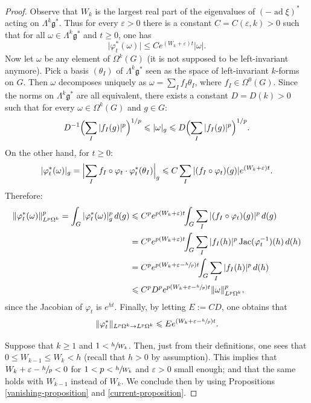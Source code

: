 \documentclass[JEP,XML,SOM,Unicode,published]{cedram}
\newcommand{\NoChangel}[1]{%
\expandafter\let\csname old\string#1\endcsname=#1
\let#1=\relax
\newcommand{#1}{\mathcode`l="716C\csname old\string#1\endcsname\mathcode`l="7160 }%
}
\theoremstyle{plain}
\theoremstyle{remark}
\theoremstyle{definition}
\DeclareMathOperator{\ad}{ad}
\DeclareMathOperator{\Jac}{Jac}
\DeclareMathOperator{\vol}{vol}\NoChangel{\vol}
\begin{document}
\begin{proof}
Observe that $W_k$ is the largest real part
of the eigenvalues of $(-\ad \xi)^*$ acting on $\Lambda^k \mathfrak g^*$.
Thus for every $\varepsilon >0$ there is a constant $C = C(\varepsilon, k) >0$ such that
for all $\omega \in \Lambda^k \mathfrak g^*$ and $t\ge0$, one has
\[\vert \varphi_t^* (\omega) \vert \leqslant C e^{(W_k + \varepsilon)t} \vert \omega \vert.\]
Now let $\omega$ be any element of $\Omega^k(G)$ (it is not supposed to be left-invariant anymore).
Pick a basis $(\theta_I)$ of $\Lambda^k \mathfrak g^*$ seen as the space of left-invariant $k$-forms on $G$.
Then $\omega$ decomposes uniquely as $\omega = \sum_I f_I \theta_I$, where $f_I \in \Omega^0(G)$.
Since the norms on $\Lambda^k \mathfrak g^*$ are all equivalent, there exists a constant $D = D(k)>0$ such that for every
$\omega \in \Omega^k(G)$ and $g \in G$:
\[D^{-1} \Bigl(\sum_I \vert f_I(g) \vert^p \Bigr)^{1/p}
\leqslant \vert \omega \vert_g \leqslant
D \Bigl(\sum_I \vert f_I(g) \vert^p \Bigr)^{1/p}.\]
On the other hand, for $t \geqslant 0$:
\[\vert \varphi_t^* (\omega) \vert_g = \Bigl\vert \sum_I f_I \circ \varphi_t\cdot \varphi_t^* (\theta_I) \Bigr\vert_g
\leqslant C \sum_I \vert (f_I \circ \varphi_t)(g) \vert e^{(W_k + \varepsilon)t}.\]
Therefore:\vspace*{-3pt}\enlargethispage{.5\baselineskip}
\begin{align*}
\Vert \varphi_t^* (\omega) \Vert_{L^p \Omega^k}^p = \int_G \vert \varphi_t^* (\omega) \vert_g^p \,d\vol(g)&\leqslant C^p e^{p(W_k + \varepsilon)t}\!\! \int_G \sum_I \vert (f_I \circ \varphi_t)(g) \vert^p \,d \vol(g)\\
&= C^p e^{p(W_k + \varepsilon)t}\!\! \int_G \sum_I \vert f_I (h) \vert^p \Jac(\varphi_t^{-1}) (h) \,d \vol (h)\\
&= C^p e^{p(W_k + \varepsilon - \sfrac{h}{p})t}\!\! \int_G \sum_I \vert f_I (h) \vert^p \,d \vol (h)\\
&\leqslant C^p D^p e^{p(W_k + \varepsilon - \sfrac{h}{p})t} \Vert \omega \Vert_{L^p \Omega^k}^p,
\end{align*}
since the Jacobian of $\varphi_t$ is $e^{ht}$.
Finally, by letting $E:= CD$, one obtains that
\[\Vert \varphi_t^*\Vert_{L^p \Omega^k \to L^p \Omega^k} \leqslant E e^{(W_k + \varepsilon - \sfrac{h}{p})t}.\]

Suppose that $k \geqslant 1$ and $1<\sfrac{h}{W_k}$.
Then, just from their definitions, one sees that $0 \leqslant W_{k-1}\leqslant W_k < h$ (recall that $h>0$ by assumption). This implies that
$W_k + \varepsilon - \sfrac{h}{p} <0$ for $1<p < \sfrac{h}{W_k}$ and $\varepsilon >0$ small enough; and that the same holds with $W_{k-1}$ instead of $W_k$.
We conclude then by using Propositions \ref{vanishing-proposition} and \ref{current-proposition}.


\end{proof}
\end{document}
